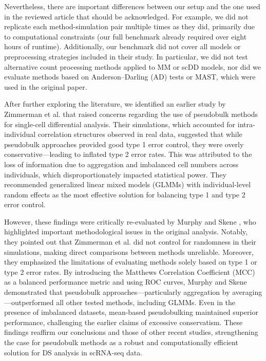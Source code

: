 \documentclass[a4paper, 11pt, twocolumn]{article}
\begin{document}
\begin{multicols}{2}
Nevertheless, there are important differences between our setup and the one used in the reviewed article that should be acknowledged. For example, we did not replicate each method-simulation pair multiple times as they did, primarily due to computational constraints (our full benchmark already required over eight hours of runtime). Additionally, our benchmark did not cover all models or preprocessing strategies included in their study. In particular, we did not test alternative count processing methods applied to MM or scDD models, nor did we evaluate methods based on Anderson–Darling (AD) tests or MAST, which were used in the original paper.

After further exploring the literature, we identified an earlier study by Zimmerman et al. \citep{zimmerman2021practical} that raised concerns regarding the use of pseudobulk methods for single-cell differential analysis. Their simulations, which accounted for intra-individual correlation structures observed in real data, suggested that while pseudobulk approaches provided good type 1 error control, they were overly conservative—leading to inflated type 2 error rates. This was attributed to the loss of information due to aggregation and imbalanced cell numbers across individuals, which disproportionately impacted statistical power. They recommended generalized linear mixed models (GLMMs) with individual-level random effects as the most effective solution for balancing type 1 and type 2 error control.

However, these findings were critically re-evaluated by Murphy and Skene \citep{murphy2022balanced}, who highlighted important methodological issues in the original analysis. Notably, they pointed out that Zimmerman et al. did not control for randomness in their simulations, making direct comparisons between methods unreliable. Moreover, they emphasized the limitations of evaluating methods solely based on type 1 or type 2 error rates. By introducing the Matthews Correlation Coefficient (MCC) as a balanced performance metric and using ROC curves, Murphy and Skene demonstrated that pseudobulk approaches—particularly aggregation by averaging—outperformed all other tested methods, including GLMMs. Even in the presence of imbalanced datasets, mean-based pseudobulking maintained superior performance, challenging the earlier claims of excessive conservatism. These findings reaffirm our conclusions and those of other recent studies, strengthening the case for pseudobulk methods as a robust and computationally efficient solution for DS analysis in scRNA-seq data.



\end{multicols}
\end{document}
